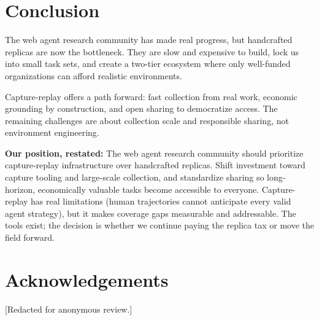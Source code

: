 \documentclass[letterpaper]{article}
\begin{document}

\section{Conclusion}
\label{sec:conclusion}

The web agent research community has made real progress, but handcrafted replicas are now the bottleneck. They are slow and expensive to build, lock us into small task sets, and create a two-tier ecosystem where only well-funded organizations can afford realistic environments.

Capture-replay offers a path forward: fast collection from real work, economic grounding by construction, and open sharing to democratize access. The remaining challenges are about collection scale and responsible sharing, not environment engineering.

\textbf{Our position, restated:} The web agent research community should prioritize capture-replay infrastructure over handcrafted replicas. Shift investment toward capture tooling and large-scale collection, and standardize sharing so long-horizon, economically valuable tasks become accessible to everyone. Capture-replay has real limitations (human trajectories cannot anticipate every valid agent strategy), but it makes coverage gaps measurable and addressable. The tools exist; the decision is whether we continue paying the replica tax or move the field forward.


\section*{Acknowledgements}

[Redacted for anonymous review.]


\newpage



\end{document}
